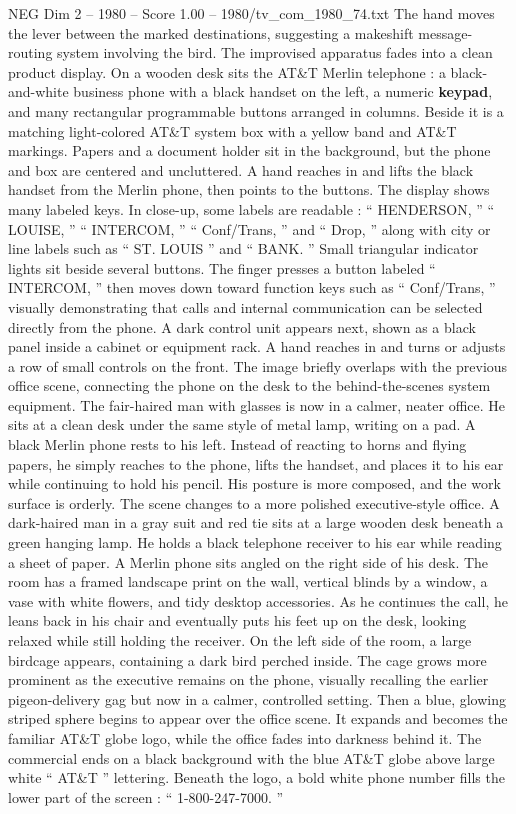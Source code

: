 \begin{textsample}{NEG Dim 2 – 1980 – Score 1.00 – 1980/tv\_com\_1980\_74.txt}
The hand moves the lever between the marked destinations, suggesting a makeshift message-routing system involving the bird.
The improvised apparatus fades into a clean product display.
On a wooden desk sits the AT\&T Merlin telephone : a black-and-white business phone with a black handset on the left, a numeric \textbf{keypad}, and many rectangular programmable buttons arranged in columns.
Beside it is a matching light-colored AT\&T system box with a yellow band and AT\&T markings.
Papers and a document holder sit in the background, but the phone and box are centered and uncluttered.
A hand reaches in and lifts the black handset from the Merlin phone, then points to the buttons.
The display shows many labeled keys.
In close-up, some labels are readable : “ HENDERSON, ” “ LOUISE, ” “ INTERCOM, ” “ Conf/Trans, ” and “ Drop, ” along with city or line labels such as “ ST.
LOUIS ” and “ BANK. ” Small triangular indicator lights sit beside several buttons.
The finger presses a button labeled “ INTERCOM, ” then moves down toward function keys such as “ Conf/Trans, ” visually demonstrating that calls and internal communication can be selected directly from the phone.
A dark control unit appears next, shown as a black panel inside a cabinet or equipment rack.
A hand reaches in and turns or adjusts a row of small controls on the front.
The image briefly overlaps with the previous office scene, connecting the phone on the desk to the behind-the-scenes system equipment.
The fair-haired man with glasses is now in a calmer, neater office.
He sits at a clean desk under the same style of metal lamp, writing on a pad.
A black Merlin phone rests to his left.
Instead of reacting to horns and flying papers, he simply reaches to the phone, lifts the handset, and places it to his ear while continuing to hold his pencil.
His posture is more composed, and the work surface is orderly.
The scene changes to a more polished executive-style office.
A dark-haired man in a gray suit and red tie sits at a large wooden desk beneath a green hanging lamp.
He holds a black telephone receiver to his ear while reading a sheet of paper.
A Merlin phone sits angled on the right side of his desk.
The room has a framed landscape print on the wall, vertical blinds by a window, a vase with white flowers, and tidy desktop accessories.
As he continues the call, he leans back in his chair and eventually puts his feet up on the desk, looking relaxed while still holding the receiver.
On the left side of the room, a large birdcage appears, containing a dark bird perched inside.
The cage grows more prominent as the executive remains on the phone, visually recalling the earlier pigeon-delivery gag but now in a calmer, controlled setting.
Then a blue, glowing striped sphere begins to appear over the office scene.
It expands and becomes the familiar AT\&T globe logo, while the office fades into darkness behind it.
The commercial ends on a black background with the blue AT\&T globe above large white “ AT\&T ” lettering.
Beneath the logo, a bold white phone number fills the lower part of the screen : “ 1-800-247-7000. ”

\end{textsample}
